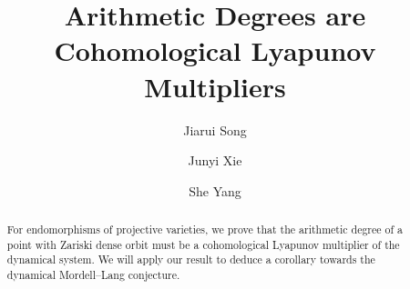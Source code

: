 \documentclass[12pt]{amsart}
\begin{document}
\begin{spacing}{1.25}

\newtheorem{theorem}{Theorem}[section]
\newtheorem{lemma}[theorem]{Lemma}
\newtheorem{proposition}[theorem]{Proposition}
\newtheorem{corollary}[theorem]{Corollary}
\newtheorem{conjecture}[theorem]{Conjecture}
\newtheorem{conv}[theorem]{Convention}
\newtheorem{ques}[theorem]{Question} 
\newtheorem{prb}[theorem]{Problem}  

	
	\theoremstyle{definition}
	\newtheorem{definition}[theorem]{Definition}
	\newtheorem{example}[theorem]{Example}
	
	\theoremstyle{remark}
	\newtheorem{remark}[theorem]{Remark}
	
	


    
	\title{Arithmetic Degrees are Cohomological Lyapunov Multipliers}
	\author{Jiarui Song}
	\address{School of Mathematical Sciences \\ Peking University \\ Beijing 100871 \\ China}
	\author{Junyi Xie}
	\address{Beijing International Center for Mathematical Research \\ Peking University \\ Beijing 100871 \\ China}
	\author{She Yang}
	\address{Beijing International Center for Mathematical Research \\ Peking University \\ Beijing 100871 \\ China}

	
	\begin{abstract}
For endomorphisms of projective varieties, we prove that the arithmetic degree of a point with Zariski dense orbit must be a cohomological Lyapunov multiplier of the dynamical system. We will apply our result to deduce a corollary towards the dynamical Mordell--Lang conjecture.
	\end{abstract}
	
	\maketitle
	\setcounter{tocdepth}{1}
	

\end{spacing}
\end{document}
